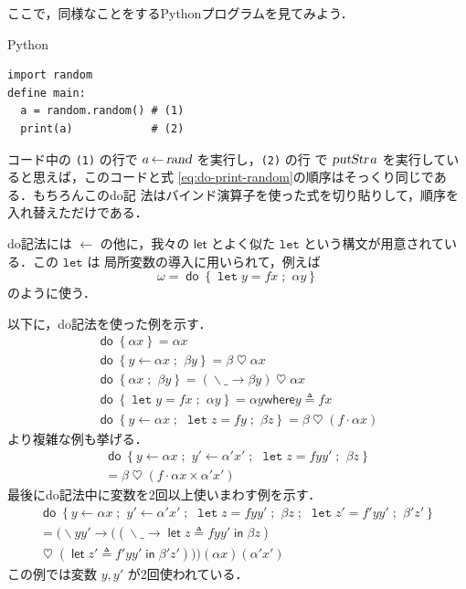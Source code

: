 \documentclass[a5paper,twoside,fleqn,draft]{jsbook}
\newcommand{\programminglanguage}[1]{\textsf{#1}}
\newcommand{\python}{\programminglanguage{Python}}
\newcommand{\code}[1]{\texttt{#1}}
\newenvironment{pythoncode}{\begin{itembox}[r]{\python}}{\end{itembox}}
\newcommand{\mKeyword}[1]{\mathsf{#1}} %
\newcommand{\mVarKeyword}[1]{\texttt{#1}} %
\newcommand{\mDoKeyword}{\mKeyword{do}}
\newcommand{\mDoLetKeyword}{\mVarKeyword{let}}
\newcommand{\mInKeyword}{\mKeyword{in}}
\newcommand{\mLetKeyword}{\mKeyword{let}}
\newcommand{\mWhereKeyword}{\mKeyword{where}}
\DeclareMathOperator{\mDoKW}{\mDoKeyword}
\DeclareMathOperator{\mInKW}{\mInKeyword} %
\DeclareMathOperator{\mLetKW}{\mLetKeyword} %
\newcommand{\mAnyParam}{\_}
\newcommand{\mAction}[1]{\textsl{#1}}
\DeclareMathOperator{\mPutStr}{\mAction{putStr}}
\DeclareMathOperator{\mRand}{\mAction{rand}}
\DeclareMathOperator{\mAppMap}{\times}
\DeclareMathOperator{\mBind}{\heartsuit}
\DeclareMathOperator{\mDoEq}{\leftarrow}
\DeclareMathOperator{\mDoLetEq}{\mVarKeyword{=}}
\DeclareMathOperator{\mDoNext}{;\;}%
\DeclareMathOperator{\mLambda}{\backslash}
\DeclareMathOperator{\mLambdaArrow}{\rightarrow}
\DeclareMathOperator{\mLetEq}{\triangleq}
\DeclareMathOperator{\mMap}{\cdot} %
\newcommand{\mDo}[1]{\mDoKW\left\{#1\right\}}
\newcommand{\mDoLet}[2]{\mathop{\mDoLetKeyword}#1\mDoLetEq#2}
\newcommand{\mLambdaExp}[2]{\mLambda{#1}\mLambdaArrow{#2}}
\newcommand{\mLetIn}[3]{\mLetKW#1\mLetEq#2\mInKW{#3}}
\newcommand{\mWhereIs}[2]{\mathbin{\mWhereKeyword}#1\mLetEq#2}
\begin{document}
ここで，同様なことをする\python プログラムを見てみよう．
\begin{pythoncode}
\begin{verbatim}
import random
define main:
  a = random.random() # (1)
  print(a)            # (2)
\end{verbatim}
\end{pythoncode}
コード中の \code{(1)} の行で $a\mDoEq\mRand$ を実行し，\code{(2)} の行
で $\mPutStr a$ を実行していると思えば，このコードと式
\eqref{eq:do-print-random}の順序はそっくり同じである．もちろんこのdo記
法はバインド演算子を使った式を切り貼りして，順序を入れ替えただけである．

do記法には $\mDoEq$ の他に，我々の $\mLetKeyword$ とよく似た
$\mDoLetKeyword$ という構文が用意されている．この $\mDoLetKeyword$ は
局所変数の導入に用いられて，例えば
\begin{equation}
\omega=\mDo{\mDoLet{y}{fx}\mDoNext\alpha y}
\end{equation}
のように使う．

以下に，do記法を使った例を示す．
\begin{gather}
\mDo{\alpha x}=\alpha x\\
\mDo{y\mDoEq\alpha x\mDoNext\beta y}=\beta\mBind\alpha x\\
\mDo{\alpha x\mDoNext\beta y}=(\mLambdaExp{\mAnyParam}{\beta y})\mBind \alpha x\label{eq:do-alpha-beta}\\
\mDo{\mDoLet{y}{fx}\mDoNext\alpha y}=\alpha y\mWhereIs{y}{fx}\\
\mDo{y\mDoEq\alpha x\mDoNext\mDoLet{z}{fy}\mDoNext\beta z}
=\beta\mBind{}(f\mMap\alpha x)
\end{gather}
より複雑な例も挙げる．
\begin{multline}
\mDo{y\mDoEq\alpha x\mDoNext y'\mDoEq\alpha'x'\mDoNext\mDoLet{z}{fyy'}
\mDoNext\beta z}\\
=\beta\mBind{}(f\mMap\alpha x\mAppMap\alpha'x')
\end{multline}
最後にdo記法中に変数を2回以上使いまわす例を示す．
\begin{multline}
\mDo{y\mDoEq\alpha x\mDoNext y'\mDoEq\alpha'x'\mDoNext\mDoLet{z}{fyy'}\mDoNext\beta z\mDoNext\mDoLet{z'}{f'yy'}\mDoNext\beta'z'}\\
=(\mLambda yy'\mLambdaArrow{}((\mLambdaExp{\mAnyParam}{\mLetIn{z}{fyy'}{\beta z}})\\
\mBind{}(\mLetIn{z'}{f'yy'}{\beta'z'}))) (\alpha x)(\alpha'x')
\end{multline}
この例では変数 $y,y'$ が2回使われている．
\end{document}
